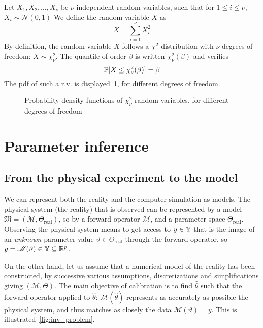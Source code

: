 \documentclass[../../Main_ManuscritThese.tex]{subfiles}
\newcommand\imgpath{/home/victor/acadwriting/Manuscrit/Text/Chapter2/img/}
\begin{document}
\begin{example}
  \label{ex:chi2}
  Let $X_1, X_2,\dots,X_{\nu}$ be $\nu$ independent random variables, such that for $1\leq i \leq \nu$, $X_i \sim \mathcal{N}(0,1)$
  We define the random variable $X$ as
  \begin{equation}
    X = \sum_{i=1}^\nu X_i^2
  \end{equation}
  By definition, the random variable $X$ follows a $\chi^2$ distribution with $\nu$ degrees of freedom: $X\sim \chi^2_{\nu}$. The quantile of order $\beta$ is written $\chi^2_{\nu}(\beta)$ and verifies
  \begin{equation}
    \mathbb{P}[X \leq \chi^2_{\nu}(\beta)] = \beta 
  \end{equation}
  The pdf of such a r.v. is displayed~\cref{fig:chi2_examples}, for different degrees of freedom.
\end{example}

\begin{figure}[ht]
  \centering
  
  \caption{Probability density functions of $\chi^2_{\nu}$ random variables, for different degrees of freedom}
  \label{fig:chi2_examples}
\end{figure}

\clearpage

\section{Parameter inference}
\label{sec:parameter_inference}
\subsection{From the physical experiment to the model}
\label{ssec:inv_problem}
We can represent both the reality and the computer simulation as models.
The physical system (the reality) that is observed can be represented by a model $\mathfrak{M}=\left(\mathscr{M},\Theta_{\mathrm{real}}\right)$, so by a forward operator $\mathscr{M}$, and a parameter space $\Theta_{\mathrm{real}}$.
Observing the physical system means to get access to $y\in \mathbb{Y}$ that is the image of an \emph{unknown} parameter value $\vartheta \in \Theta_{\mathrm{real}}$ through the forward operator, so $y = \mathscr{M}(\vartheta)\in \mathbb{Y} \subseteq \mathbb{R}^p$.

On the other hand, let us assume that a numerical model of the reality has been constructed, by successive various assumptions, discretizations and simplifications giving $(\mathcal{M},\Theta)$. The main objective of calibration is to find $\hat{\theta}$ such that the forward operator applied to $\hat{\theta}$: $\mathcal{M}(\hat{\theta})$ represents as accurately as possible the physical system, and thus matches as closely the data $\mathscr{M}(\vartheta)=y$. This is illustrated~\cref{fig:inv_problem}.
\end{document}
